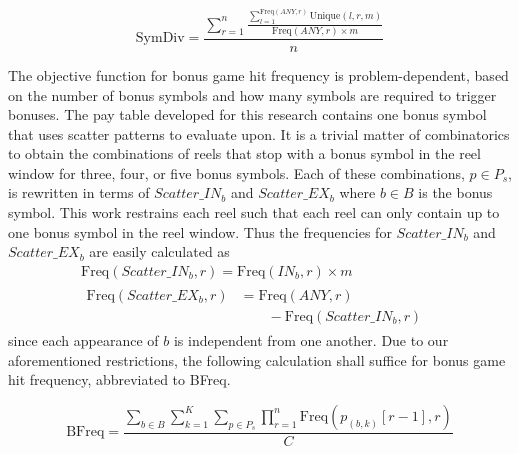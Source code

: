 \documentclass[conference]{IEEEtran}
\begin{document}
\begin{equation}
\text{SymDiv} = \frac{\sum_{r=1}^{n}\frac{\sum_{l=1}^{\text{Freq}(ANY,r)}\text{Unique}(l,r,m)}{\text{Freq}(ANY,r)\times m}}{n}
\end{equation}
\par
The objective function for bonus game hit frequency is problem-dependent, based on the number of bonus symbols and how many symbols are required to trigger bonuses.
The pay table developed for this research contains one bonus symbol that uses scatter patterns to evaluate upon.
It is a trivial matter of combinatorics to obtain the combinations of reels that stop with a bonus symbol in the reel window for three, four, or five bonus symbols.
Each of these combinations, $p \in P_s$, is rewritten in terms of $Scatter\_{IN}_b$ and $Scatter\_{EX}_b$ where $b\in B$ is the bonus symbol.
This work restrains each reel such that each reel can only contain up to one bonus symbol in the reel window.
Thus the frequencies for $Scatter\_{IN}_b$ and $Scatter\_{EX}_b$ are easily calculated as
\begin{align}
		\text{Freq}(Scatter\_{IN}_b,r) = \text{Freq}(IN_b,r) \times m \text{ }\text{ }\text{ }\text{ }\text{ }\text{ }\text{ }\text{ }& \\
   \begin{aligned}
      \text{Freq}(Scatter\_{EX}_b,r) &= \text{Freq}(ANY,r)\\
      &\text{ }\text{ }\text{ }- \text{Freq}(Scatter\_{IN}_b,r)
   \end{aligned}
\end{align}
since each appearance of $b$ is independent from one another.
Due to our aforementioned restrictions, the following calculation shall suffice for bonus game hit frequency, abbreviated to BFreq.

\begin{equation}
\text{BFreq} = \frac{\sum_{b \in B}\sum_{k=1}^{K}\sum_{p \in P_s}\prod_{r=1}^{n}\text{Freq}(p_{(b,k)}[r-1],r)}{C}
\end{equation}
\end{document}
